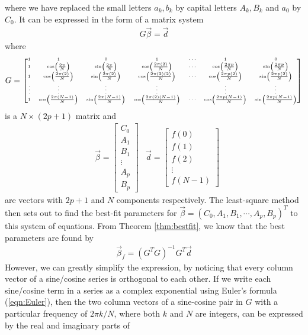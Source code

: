 where we have replaced the small letters $a_k, b_k$ by capital letters $A_k, B_k$ and $a_0$ by $C_0$. It can be expressed in the form of a matrix system
\begin{align}
G\vec{\beta} = \vec{d}    
\end{align}
where
\begin{align}
G =
\tiny
\begin{bmatrix}
1 & 1 & 0 & 1 & \cdots & 1 & 0 \\
1 & \cos(\frac{2\pi}{N}) & \sin(\frac{2\pi}{N}) & \cos(\frac{2\pi(2)}{N}) & \cdots & \cos(\frac{2\pi p}{N}) & \sin(\frac{2\pi p}{N}) \\
1 & \cos(\frac{2\pi(2)}{N}) & \sin(\frac{2\pi(2)}{N}) & \cos(\frac{2\pi(2)(2)}{N}) & \cdots & \cos(\frac{2\pi p (2)}{N}) & \sin(\frac{2\pi p (2)}{N}) \\
\vdots & \vdots & \vdots & \vdots & & \vdots & \vdots \\
1 & \cos(\frac{2\pi(N-1)}{N}) & \sin(\frac{2\pi(N-1)}{N}) & \cos(\frac{2\pi(2)(N-1)}{N}) & \cdots & \cos(\frac{2\pi p(N-1)}{N}) & \sin(\frac{2\pi p(N-1)}{N}) \\
\end{bmatrix}
\end{align}
is a $N \times (2p+1)$ matrix and
\begin{align}
&\vec{\beta} = 
\begin{bmatrix}
C_0 \\
A_1 \\
B_1 \\
\vdots \\
A_p \\
B_p
\end{bmatrix}
&\vec{d} = 
\begin{bmatrix}
f(0) \\
f(1) \\
f(2) \\
\vdots \\
f(N-1)
\end{bmatrix}
\end{align}
are vectors with $2p+1$ and $N$ components respectively. The least-square method then sets out to find the best-fit parameters for $\vec{\beta} = (C_0, A_1, B_1, \cdots, A_p, B_p)^T$ to this system of equations. From Theorem \ref{thm:bestfit}, we know that the best parameters are found by
\begin{align}
\vec{\beta}_f = (G^TG)^{-1}G^T\vec{d}
\end{align}
However, we can greatly simplify the expression, by noticing that every column vector of a sine/cosine series is orthogonal to each other. If we write each sine/cosine term in a series as a complex exponential using Euler's formula (\ref{eqn:Euler}), then the two column vectors of a sine-cosine pair in $G$ with a particular frequency of $2\pi k/N$, where both $k$ and $N$ are integers, can be expressed by the real and imaginary parts of
